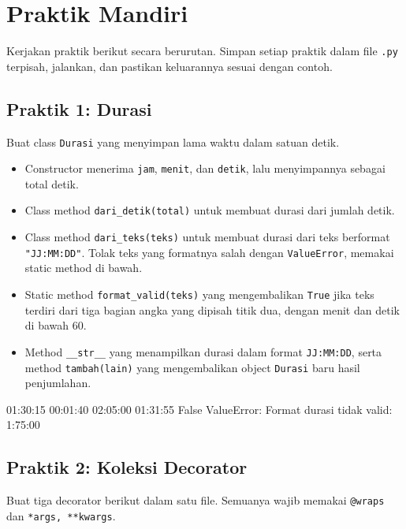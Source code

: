 \section{Praktik Mandiri}

Kerjakan praktik berikut secara berurutan. Simpan setiap praktik dalam file \texttt{.py} terpisah, jalankan, dan pastikan keluarannya sesuai dengan contoh.

\subsection{Praktik 1: Durasi}

Buat class \texttt{Durasi} yang menyimpan lama waktu dalam satuan detik.

\begin{itemize}
  \item Constructor menerima \texttt{jam}, \texttt{menit}, dan \texttt{detik}, lalu menyimpannya sebagai total detik.
  \item Class method \texttt{dari\_detik(total)} untuk membuat durasi dari jumlah detik.
  \item Class method \texttt{dari\_teks(teks)} untuk membuat durasi dari teks berformat \texttt{"JJ:MM:DD"}. Tolak teks yang formatnya salah dengan \texttt{ValueError}, memakai static method di bawah.
  \item Static method \texttt{format\_valid(teks)} yang mengembalikan \texttt{True} jika teks terdiri dari tiga bagian angka yang dipisah titik dua, dengan menit dan detik di bawah 60.
  \item Method \texttt{\_\_str\_\_} yang menampilkan durasi dalam format \texttt{JJ:MM:DD}, serta method \texttt{tambah(lain)} yang mengembalikan object \texttt{Durasi} baru hasil penjumlahan.
\end{itemize}

\begin{keluaran}
01:30:15
00:01:40
02:05:00
01:31:55
False
ValueError: Format durasi tidak valid: 1:75:00
\end{keluaran}

\subsection{Praktik 2: Koleksi Decorator}

Buat tiga decorator berikut dalam satu file. Semuanya wajib memakai \texttt{@wraps} dan \texttt{*args, **kwargs}.

